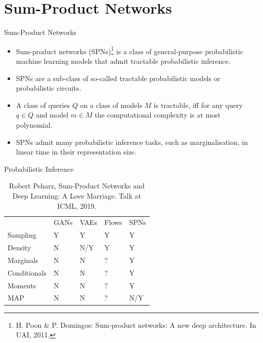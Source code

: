 \section{Sum-Product Networks}

\begin{frame}{Sum-Product Networks}
\begin{itemize}
  \item Sum-product networks (SPNs)\footnote{\scriptsize H. Poon \& P. Domingos: Sum-product networks: A new deep architecture. In UAI, 2011.} is a class of general-purpose probabilistic machine learning models that admit tractable probabilistic inference.
  \item SPNs are a sub-class of so-called tractable probabilistic models or probabilistic circuits.
   \item A class of queries $Q$ on a class of models $M$ is tractable, iff for any query $q \in Q$ and model $m \in M$ the computational complexity is at most polynomial.
  \item SPNs admit many probabilistic inference tasks, such as marginalisation, in linear time in their representation size.
  \end{itemize}
\end{frame}

\begin{frame}{Probabilistic Inference}
\begin{table}
\centering
\begin{tabular}{lllll}
             & GANs & VAEs & Flows & SPNs  \\
Sampling     & Y    & Y    & Y     & Y      \\
Density      & N    & N/Y  & Y     & Y      \\
Marginals    & N    & N    & ?     & Y      \\
Conditionals & N    & N    & ?     & Y      \\
Moments      & N    & N    & ?     & Y      \\
MAP          & N    & N    & ?     & N/Y
\end{tabular}
\caption{\scriptsize Robert Peharz, Sum-Product Networks and Deep Learning: A Love Marriage. Talk at ICML, 2019.}
\end{table}
\end{frame}

